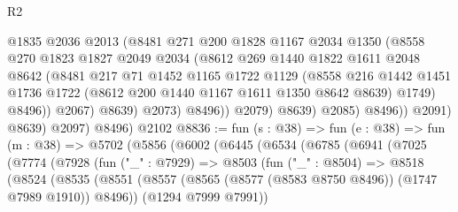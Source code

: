 \begin{lexlean}{R2}
\begin{coremodule}
                            @1835
                            @2036
                            @2013
                            (@8481
                              @271
                              @200
                              @1828
                              @1167
                              @2034
                              @1350
                              (@8558
                                @270
                                @1823
                                @1827
                                @2049
                                @2034
                                (@8612
                                  @269
                                  @1440
                                  @1822
                                  @1611
                                  @2048
                                  @8642
                                  (@8481
                                    @217
                                    @71
                                    @1452
                                    @1165
                                    @1722
                                    @1129
                                    (@8558
                                      @216
                                      @1442
                                      @1451
                                      @1736
                                      @1722
                                      (@8612 @200 @1440 @1167 @1611 @1350 @8642 @8639)
                                      @1749)
                                    @8496))
                                @2067)
                              @8639)
                            @2073)
                          @8496))
                      @2079)
                    @8639)
                  @2085)
                @8496))
            @2091)
          @8639)
        @2097)
      @8496)
    @2102
@8836 := fun (s : @38) =>
  fun (e : @38) =>
  fun (m : @38) =>
  @5702
    (@5856
      (@6002
        (@6445
          (@6534
            (@6785
              (@6941
                (@7025
                  (@7774
                    (@7928
                      (fun ("_" : @7929) =>
                      @8503
                        (fun ("_" : @8504) =>
                        @8518
                          (@8524
                            (@8535
                              (@8551
                                (@8557
                                  (@8565 (@8577 (@8583 @8750 @8496)) (@1747 @7989 @1910))
                                  @8496))
                              (@1294 @7999 @7991))

\end{coremodule}
\end{lexlean}

